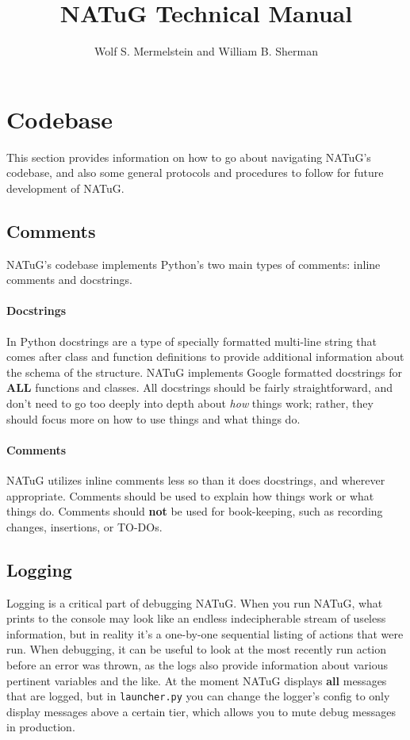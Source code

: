 \documentclass[titlepage]{article}
\title{NATuG Technical Manual}
\author{Wolf S. Mermelstein and William B. Sherman}
\begin{document}
	\maketitle
	\tableofcontents 
	\newpage
	
	\section{Codebase}
	This section provides information on how to go about navigating NATuG's codebase, and also some general protocols and procedures to follow for future development of NATuG.
	
	\subsection{Comments}
	NATuG's codebase implements Python's two main types of comments: inline comments and docstrings.
	
	\paragraph{Docstrings}
	In Python docstrings are a type of specially formatted multi-line string that comes after class and function definitions to provide additional information about the schema of the structure. NATuG implements Google formatted docstrings for \textbf{ALL} functions and classes. All docstrings should be fairly straightforward, and don't need to go too deeply into depth about \textit{how} things work; rather, they should focus more on how to use things and what things do.
	
	\paragraph{Comments}
	NATuG utilizes inline comments less so than it does docstrings, and wherever appropriate. Comments should be used to explain how things work or what things do. Comments should \textbf{not} be used for book-keeping, such as recording changes, insertions, or TO-DOs.
	
	\subsection{Logging}
	Logging is a critical part of debugging NATuG. When you run NATuG, what prints to the console may look like an endless indecipherable stream of useless information, but in reality it's a one-by-one sequential listing of actions that were run. When debugging, it can be useful to look at the most recently run action before an error was thrown, as the logs also provide information about various pertinent variables and the like. At the moment NATuG displays \textbf{all} messages that are logged, but in \texttt{launcher.py} you can change the logger's config to only display messages above a certain tier, which allows you to mute debug messages in production. 
	
\end{document}
